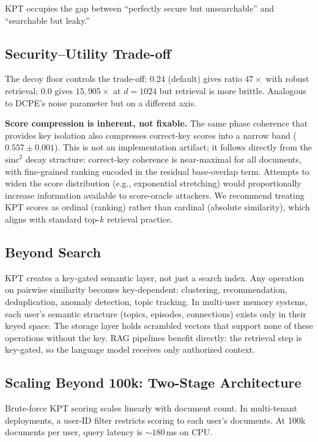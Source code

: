 \documentclass{article}
\begin{document}
KPT occupies the gap between ``perfectly secure but unsearchable'' and ``searchable but leaky.''

\subsection{Security--Utility Trade-off}

The decoy floor controls the trade-off: 0.24 (default) gives ratio $47\times$ with robust retrieval; 0.0 gives $15{,}905\times$ at $d{=}1024$ but retrieval is more brittle.
Analogous to DCPE's noise parameter but on a different axis.

\textbf{Score compression is inherent, not fixable.}
The same phase coherence that provides key isolation also compresses correct-key scores into a narrow band ($0.557 \pm 0.001$).
This is not an implementation artifact; it follows directly from the $\mathrm{sinc}^2$ decay structure: correct-key coherence is near-maximal for all documents, with fine-grained ranking encoded in the residual base-overlap term.
Attempts to widen the score distribution (e.g., exponential stretching) would proportionally increase information available to score-oracle attackers.
We recommend treating KPT scores as ordinal (ranking) rather than cardinal (absolute similarity), which aligns with standard top-$k$ retrieval practice.

\subsection{Beyond Search}

KPT creates a key-gated semantic layer, not just a search index.
Any operation on pairwise similarity becomes key-dependent: clustering, recommendation, deduplication, anomaly detection, topic tracking.
In multi-user memory systems, each user's semantic structure (topics, episodes, connections) exists only in their keyed space.
The storage layer holds scrambled vectors that support none of these operations without the key.
RAG pipelines benefit directly: the retrieval step is key-gated, so the language model receives only authorized context.

\subsection{Scaling Beyond 100k: Two-Stage Architecture}

Brute-force KPT scoring scales linearly with document count. In multi-tenant deployments, a user-ID filter restricts scoring to each user's documents. At 100k documents per user, query latency is ${\sim}180$\,ms on CPU.
\end{document}
